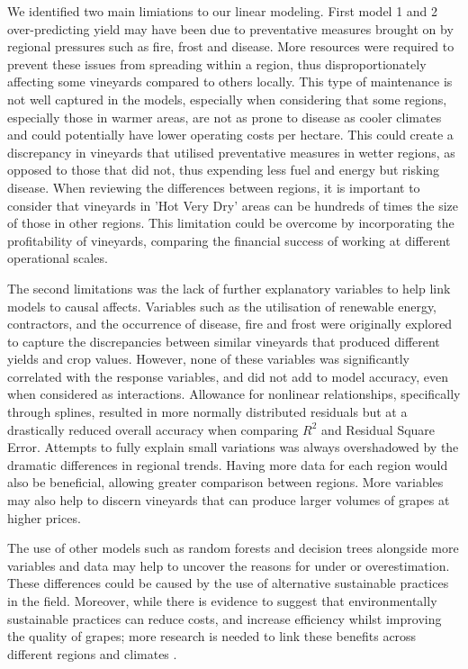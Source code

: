\documentclass[review,12pt,authoryear]{elsarticle}
\begin{document}
\begin{linenumbers}
We identified two main limiations to our linear modeling. First model 1 and 2 over-predicting yield may have been due to preventative measures brought on by regional pressures such as fire, frost and disease. More resources were required to prevent these issues from spreading within a region, thus disproportionately affecting some vineyards compared to others locally. This type of maintenance is not well captured in the models, especially when considering that some regions, especially those in warmer areas, are not as prone to disease as cooler climates and could potentially have lower operating costs per hectare. This could create a discrepancy in vineyards that utilised preventative measures in wetter regions, as opposed to those that did not, thus expending less fuel and energy but risking disease. When reviewing the differences between regions, it is important to consider that vineyards in 'Hot Very Dry' areas can be hundreds of times the size of those in other regions. This limitation could be overcome by incorporating the profitability of vineyards, comparing the financial success of working at different operational scales.
\par
The second limitations was the lack of further explanatory variables to help link models to causal affects. Variables such as the utilisation of renewable energy, contractors, and the occurrence of disease, fire and frost were originally explored to capture the discrepancies between similar vineyards that produced different yields and crop values. However, none of these variables was significantly correlated with the response variables, and did not add to model accuracy, even when considered as interactions. Allowance for nonlinear relationships, specifically through splines, resulted in more normally distributed residuals but at a drastically reduced overall accuracy when comparing $R^2$ and Residual Square Error. Attempts to fully explain small variations was always overshadowed by the dramatic differences in regional trends. Having more data for each region would also be beneficial, allowing greater comparison between regions. More variables may also help to discern vineyards that can produce larger volumes of grapes at higher prices.
\par
The use of other models such as random forests and decision trees alongside more variables and data may help to uncover the reasons for under or overestimation. These differences could be caused by the use of alternative sustainable practices in the field. Moreover, while there is evidence to suggest that environmentally sustainable practices can reduce costs, and increase efficiency whilst improving the quality of grapes; more research is needed to link these benefits across different regions and climates \citep{baianoOverviewSustainabilityWine2021,marianiSustainableWinegrowingCurrent2015,montalvo-falconSustainabilityResearchWine2023}.

\end{linenumbers}
\end{document}
